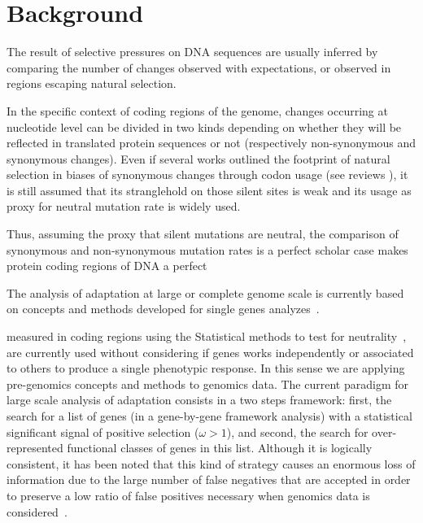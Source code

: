 

\section{Background}

The result of selective pressures on DNA sequences are usually inferred by comparing the number of changes observed with expectations, or observed in regions escaping natural selection.

In the specific context of coding regions of the genome, changes occurring at nucleotide level can be divided in two kinds depending on whether they will be reflected in translated protein sequences or not (respectively non-synonymous and synonymous changes). Even if several works outlined the footprint of natural selection in biases of synonymous changes through codon usage (see reviews \cite{Hershberg2008,Plotkin2011}), it is still assumed that its stranglehold on those silent sites is weak  \cite{Yang2008} and its usage as proxy for neutral mutation rate is widely used.

Thus, assuming the proxy that silent mutations are neutral, the comparison of synonymous and non-synonymous mutation rates is a perfect scholar case
makes protein coding regions of DNA a perfect 

The analysis of adaptation at large or complete genome scale is currently based on concepts and methods developed for single genes analyzes~\cite{Arbiza2006,Bakewell2007,Bustamante2005,Clark2003,Nielsen2005}. 

measured in coding regions using the  Statistical methods to test for neutrality~\cite{Nielsen2001}, are currently used without considering if genes works independently or associated to others to produce a single phenotypic response. In this sense we are applying pre-genomics concepts and methods to genomics data. The current paradigm for large scale analysis of adaptation consists in a two steps framework: first, the search for a list of genes (in a gene-by-gene framework analysis) with a statistical significant signal of positive selection ($\omega > 1$), and second, the search for over-represented functional classes of genes in this list. Although it is logically consistent, it has been noted that this kind of strategy causes an enormous loss of information due to the large number of false negatives that are accepted in order to preserve a low ratio of false positives necessary when genomics data is considered~\cite{Al-Shahrour2007,Al-Shahrour2005a,Al-Shahrour2006,Subramanian2005}.

